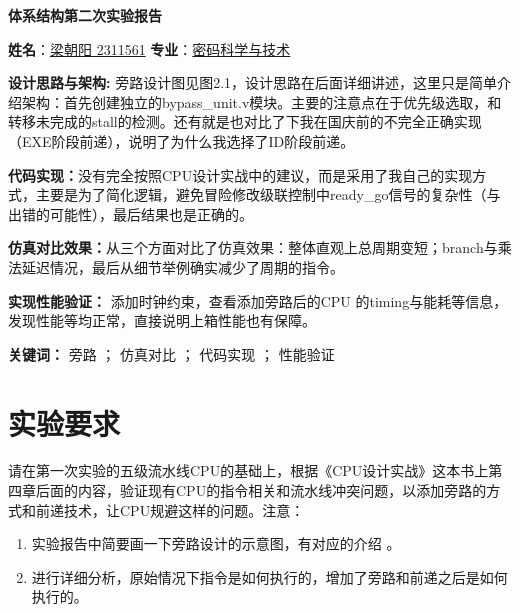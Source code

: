 \documentclass[a4paper]{article}
\begin{document}
\renewcommand{\figurename}{图}
\renewcommand{\contentsname}{目录}  
\renewcommand{\abstractname}{\textbf{\Large 摘要}} 

\begin{center}
    \huge{\textbf{体系结构第二次实验报告}}
\end{center}

\begin{center}
    \textbf{姓名}：\underline{梁朝阳 2311561} \quad
    \textbf{专业}：\underline{密码科学与技术}
\end{center}

\tableofcontents

\vspace*{1cm}


\vspace{1em}

\textbf{设计思路与架构:} 
旁路设计图见图2.1，设计思路在后面详细讲述，这里只是简单介绍架构：首先创建独立的bypass\_unit.v模块。主要的注意点在于优先级选取，和转移未完成的stall的检测。还有就是也对比了下我在国庆前的不完全正确实现（EXE阶段前递），说明了为什么我选择了ID阶段前递。

\textbf{代码实现：}没有完全按照CPU设计实战中的建议，而是采用了我自己的实现方式，主要是为了简化逻辑，避免冒险修改级联控制中ready\_go信号的复杂性（与出错的可能性），最后结果也是正确的。

\textbf{仿真对比效果：}从三个方面对比了仿真效果：整体直观上总周期变短；branch与乘法延迟情况，最后从细节举例确实减少了周期的指令。

\textbf{实现性能验证：} 添加时钟约束，查看添加旁路后的CPU 的timing与能耗等信息，发现性能等均正常，直接说明上箱性能也有保障。

\noindent \textbf{关键词：} 旁路 ； 仿真对比 ； 代码实现 ； 性能验证


\newpage

\section{实验要求}

请在第一次实验的五级流水线CPU的基础上，根据《CPU设计实战》这本书上第四章后面的内容，验证现有CPU的指令相关和流水线冲突问题，以添加旁路的方式和前递技术，让CPU规避这样的问题。注意：

\begin{enumerate}
    \item 实验报告中简要画一下旁路设计的示意图，有对应的介绍 。  
    \item 进行详细分析，原始情况下指令是如何执行的，增加了旁路和前递之后是如何执行的。
\end{enumerate}
\end{document}
